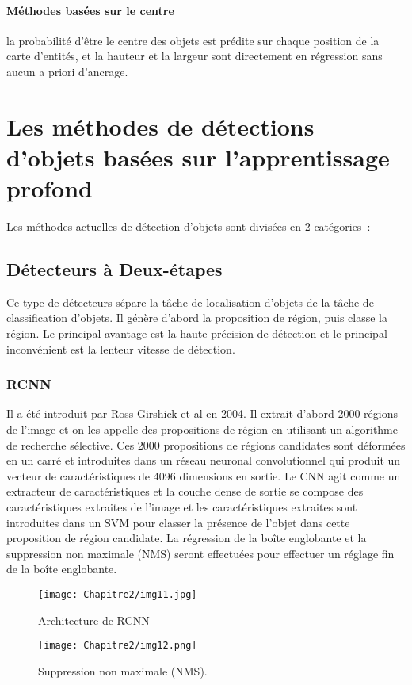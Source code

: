           \paragraph{Méthodes basées sur le centre} la probabilité d'être le centre des objets est prédite sur chaque position de la carte d'entités, et la hauteur et la largeur sont directement en régression sans aucun a priori d'ancrage.

\section{Les méthodes de détections d'objets basées sur l'apprentissage profond} 
Les méthodes actuelles de détection d'objets sont divisées en 2 catégories :
     \subsection{Détecteurs à Deux-étapes}
     Ce type de détecteurs sépare la tâche de localisation d'objets de la tâche de classification d'objets. Il génère d'abord la proposition de région, puis classe la région. Le principal avantage est la haute précision de détection et le principal inconvénient est la lenteur vitesse de détection.
     
     \subsubsection{RCNN} \cite{rcnn_paper}
     Il a été introduit par Ross Girshick et al en 2004. Il extrait d'abord 2000 régions de l'image et on les appelle des propositions de région en utilisant un algorithme de recherche sélective. Ces 2000 propositions de régions candidates sont déformées en un carré et introduites dans un réseau neuronal convolutionnel qui produit un vecteur de caractéristiques de 4096 dimensions en sortie. Le CNN agit comme un extracteur de caractéristiques et la couche dense de sortie se compose des caractéristiques extraites de l'image et les caractéristiques extraites sont introduites dans un SVM pour classer la présence de l'objet dans cette proposition de région candidate. La régression de la boîte englobante et la suppression non maximale (NMS) seront effectuées pour effectuer un réglage fin de la boîte englobante.
     \begin{figure}[H]
          \centering
          \texttt{[image: Chapitre2/img11.jpg]}
          \caption{Architecture de RCNN}
          \label{img11}
          \end{figure}
     \begin{figure}[H]
          \centering
          \texttt{[image: Chapitre2/img12.png]}
          \caption{Suppression non maximale (NMS).}
          \label{img12}
          \end{figure}

